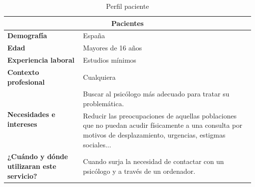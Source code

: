 \begin{table}[htpb]
\centering
\begin{tabular}{|l|l|}
\hline
\multicolumn{2}{|c|}{\textbf{Pacientes}}                                                                                                                                                                               \\ \hline
\textbf{Demografía}                                & España                                                                                                                                                            \\ \hline
\textbf{Edad}                                      & Mayores de 16 años                                                                                                                                                \\ \hline
\textbf{Experiencia laboral}                       & Estudios mínimos                                                                                                                                                  \\ \hline
\textbf{Contexto profesional}                      & Cualquiera                                                                                                                                                        \\ \hline
\multirow{2}{*}{\textbf{Necesidades e intereses}}  & Buscar al psicólogo más adecuado para tratar su problemática.                                                                                                     \\ \cline{2-2} 
                                                   & Reducir las preocupaciones de aquellas poblaciones que no puedan acudir físicamente a una consulta por motivos de desplazamiento, urgencias, estigmas sociales... \\ \hline
\textbf{¿Cuándo y dónde utilizaran este servicio?} & Cuando surja la necesidad de contactar con un psicólogo y a través de un ordenador.                                                                               \\ \hline
\end{tabular}
\caption{Perfil paciente}
\label{perf_pac}
\end{table}


